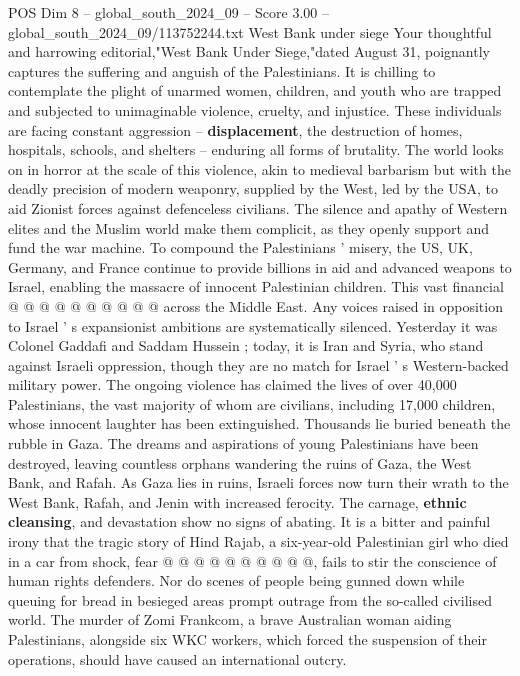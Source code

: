 \begin{textsample}{POS Dim 8 – global\_south\_2024\_09 – Score 3.00 – global\_south\_2024\_09/113752244.txt}  \label{ex:f8_pos_283}
West Bank under siege Your thoughtful and harrowing editorial,"West Bank Under Siege,"dated August 31, poignantly captures the suffering and anguish of the Palestinians.
It is chilling to contemplate the plight of unarmed women, children, and youth who are trapped and subjected to unimaginable violence, cruelty, and injustice.
These individuals are facing constant aggression -- \textbf{displacement}, the destruction of homes, hospitals, schools, and shelters -- enduring all forms of brutality.
The world looks on in horror at the scale of this violence, akin to medieval barbarism but with the deadly precision of modern weaponry, supplied by the West, led by the USA, to aid Zionist forces against defenceless civilians.
The silence and apathy of Western elites and the Muslim world make them complicit, as they openly support and fund the war machine.
To compound the Palestinians ' misery, the US, UK, Germany, and France continue to provide billions in aid and advanced weapons to Israel, enabling the massacre of innocent Palestinian children.
This vast financial @ @ @ @ @ @ @ @ @ @ across the Middle East.
Any voices raised in opposition to Israel ' s expansionist ambitions are systematically silenced.
Yesterday it was Colonel Gaddafi and Saddam Hussein ; today, it is Iran and Syria, who stand against Israeli oppression, though they are no match for Israel ' s Western-backed military power.
The ongoing violence has claimed the lives of over 40,000 Palestinians, the vast majority of whom are civilians, including 17,000 children, whose innocent laughter has been extinguished.
Thousands lie buried beneath the rubble in Gaza.
The dreams and aspirations of young Palestinians have been destroyed, leaving countless orphans wandering the ruins of Gaza, the West Bank, and Rafah.
As Gaza lies in ruins, Israeli forces now turn their wrath to the West Bank, Rafah, and Jenin with increased ferocity.
The carnage, \textbf{ethnic} \textbf{cleansing}, and devastation show no signs of abating.
It is a bitter and painful irony that the tragic story of Hind Rajab, a six-year-old Palestinian girl who died in a car from shock, fear @ @ @ @ @ @ @ @ @ @, fails to stir the conscience of human rights defenders.
Nor do scenes of people being gunned down while queuing for bread in besieged areas prompt outrage from the so-called civilised world.
The murder of Zomi Frankcom, a brave Australian woman aiding Palestinians, alongside six WKC workers, which forced the suspension of their operations, should have caused an international outcry.

\end{textsample}
